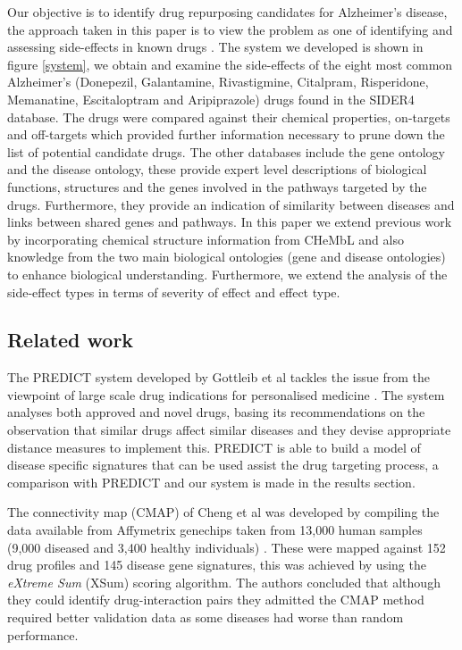 \documentclass[preprint,12pt]{elsarticle}
\begin{document}
Our objective  is to identify drug repurposing candidates for Alzheimer's disease, the approach taken in this paper is to view the problem as one of identifying and assessing side-effects in known drugs \cite{McGarry2015a,Kuhn2010}.  The system we developed is shown in figure \ref{system}, we obtain and examine the side-effects of the eight most common Alzheimer's (Donepezil, Galantamine, Rivastigmine, Citalpram, Risperidone, Memanatine, Escitaloptram and Aripiprazole) drugs found in the SIDER4 database. The drugs were compared against their chemical properties, on-targets and off-targets which provided further information necessary to prune down the list of potential candidate drugs. The other databases include the gene ontology and the disease ontology, these provide expert level descriptions of biological functions, structures and the genes involved in the pathways targeted by the drugs.  Furthermore, they provide an indication of similarity between diseases and links between shared genes and pathways. In this paper we extend previous work by incorporating chemical structure information from CHeMbL and also knowledge from the two main biological ontologies (gene and disease ontologies) to enhance biological understanding. Furthermore, we extend the analysis of the side-effect types in terms of severity of effect and effect type.

\subsection{Related work}
The PREDICT system developed by Gottleib et al  tackles the issue from the viewpoint of large scale drug indications for personalised medicine \cite{Gottlieb2011}. The system analyses both approved and novel drugs, basing its recommendations on the observation that similar drugs affect similar diseases and they devise appropriate distance measures to implement this. PREDICT is able to build a model of disease specific signatures that can be used assist the drug targeting process, a comparison with PREDICT and our system is made in the results section.

The connectivity map (CMAP) of Cheng et al was developed by compiling the data available from Affymetrix genechips taken from 13,000 human samples (9,000 diseased and 3,400 healthy individuals) \cite{Cheng2014}. These were mapped against 152 drug profiles and 145 disease gene signatures, this was achieved by using the {\it eXtreme Sum} (XSum) scoring algorithm. The authors concluded that although they could identify drug-interaction pairs they admitted the CMAP method required better validation data as some diseases had worse than random performance.
\end{document}
